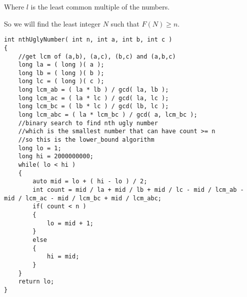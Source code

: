 Where $l$ is the least common multiple of the numbers.

So we will find the least integer $N$ such that $F(N)\geq n$.

\setcounter{lstlisting}{0}
\begin{lstlisting}[style=customc, caption={Binary Search}]
int nthUglyNumber( int n, int a, int b, int c )
{
    //get lcm of (a,b), (a,c), (b,c) and (a,b,c)
    long la = ( long )( a );
    long lb = ( long )( b );
    long lc = ( long )( c );
    long lcm_ab = ( la * lb ) / gcd( la, lb );
    long lcm_ac = ( la * lc ) / gcd( la, lc );
    long lcm_bc = ( lb * lc ) / gcd( lb, lc );
    long lcm_abc = ( la * lcm_bc ) / gcd( a, lcm_bc );
    //binary search to find nth ugly number
    //which is the smallest number that can have count >= n
    //so this is the lower_bound algorithm
    long lo = 1;
    long hi = 2000000000;
    while( lo < hi )
    {
        auto mid = lo + ( hi - lo ) / 2;
        int count = mid / la + mid / lb + mid / lc - mid / lcm_ab - mid / lcm_ac - mid / lcm_bc + mid / lcm_abc;
        if( count < n )
        {
            lo = mid + 1;
        }
        else
        {
            hi = mid;
        }
    }
    return lo;
}
\end{lstlisting}